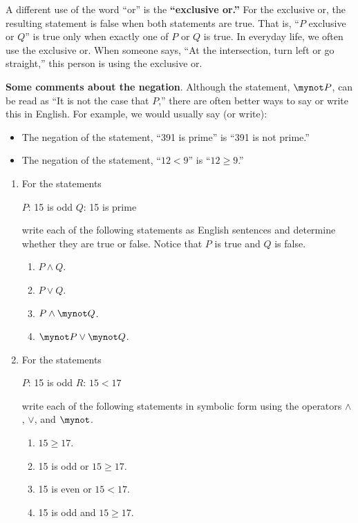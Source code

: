 \begin{previewactivity}
A different use of the word ``or'' is the \textbf{``exclusive or.''}
%
  For the exclusive or, the resulting statement is false when both statements are true. That is, ``$P$ exclusive or $Q$'' is true only when exactly one of  $P$  or  $Q$  is true.  In everyday life, we often use the exclusive or.  When someone says, ``At the intersection, turn left or go straight,'' this person is using the exclusive or.

\newpar
\textbf{Some comments about the negation}.  Although the statement, $\mynot P$, can be read as ``It is not the case that $P$,'' there are often better ways to say or write this in English.  For example, we would usually say (or write): 
\begin{itemize}
  \item The negation of the statement, ``391 is prime'' is  ``391 is not prime.''
  \item The negation of the statement, ``$12 < 9$'' is  ``$12 \geq 9$.''
\end{itemize}


\begin{enumerate}
  \item For the statements
\begin{center}
$P$: 15 is odd \qquad \qquad $Q$: 15 is prime
\end{center}
write each of the following statements as English sentences and determine whether they are true or false.  Notice that $P$ is true and $Q$ is false.
\begin{multicols}{4}
\begin{enumerate}
  \item $P \wedge Q$.
  \item $P \vee Q$.
  \item $P \wedge \mynot Q$.
  \item $\mynot P \vee \mynot Q$.
\end{enumerate}
\end{multicols}

  \item For the statements
\begin{center}
$P$:  15 is odd \qquad \qquad $R$: $15 < 17$
\end{center}
write each of the following statements in symbolic form using the operators $\wedge$, $\vee$, and 
$\mynot$.
\begin{multicols}{2}
\begin{enumerate}
  \item $15 \geq 17$.
  \item 15 is odd or $15 \geq 17$.
  \item 15 is even or $15 < 17$.
  \item 15 is odd and $15 \geq 17$.
\end{enumerate}
\end{multicols}
\end{enumerate}
\end{previewactivity}
\hbreak




